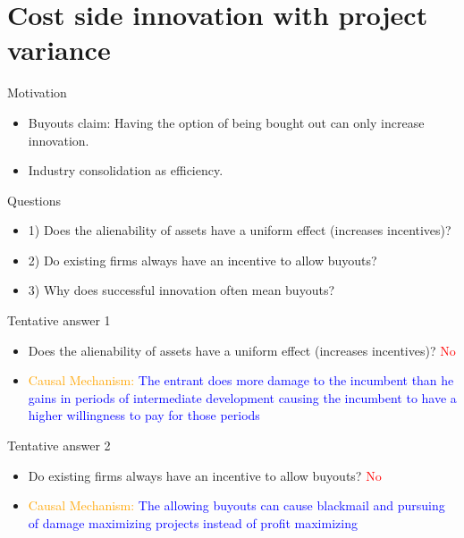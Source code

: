 \documentclass{beamer}
\numberwithin{equation}{section}
\begin{document}
\section{Cost side innovation with project variance}
\begin{frame}{Motivation}
\begin{itemize}
    \item Buyouts claim: Having the option of being bought out can only increase innovation. 
    \item Industry consolidation as efficiency.
\end{itemize}
\end{frame}
\begin{frame}{Questions}
\begin{itemize}
    \item 1) Does the alienability of assets have a uniform effect (increases incentives)?
    \item 2) Do existing firms always have an incentive to allow buyouts?
    \item 3) Why does successful innovation often mean buyouts?
\end{itemize}
\end{frame}
\begin{frame}{Tentative answer 1}
\begin{itemize}
    \item Does the alienability of assets have a uniform effect (increases incentives)? \textcolor{red}{No}
    \item \textcolor{orange}{Causal Mechanism:} \textcolor{blue}{The entrant does more damage to the incumbent than he gains in periods of intermediate development causing the incumbent to have a higher willingness to pay for those periods}
\end{itemize}
\end{frame}
\begin{frame}{Tentative answer 2}
\begin{itemize}
    \item Do existing firms always have an incentive to allow buyouts? \textcolor{red}{No}
    \item \textcolor{orange}{Causal Mechanism:} \textcolor{blue}{The allowing buyouts can cause blackmail and pursuing of damage maximizing projects instead of profit maximizing}
\end{itemize}
\end{frame}
\end{document}
